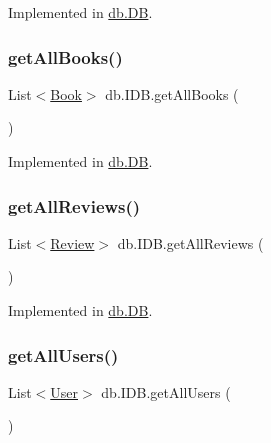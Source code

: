 Implemented in \hyperlink{classdb_1_1_d_b_a8a1a15bae4352c3c73092d801ef26c41}{db.\+DB}.

\mbox{\label{interfacedb_1_1_i_d_b_abd0d41674bbcdd524a3ca2403504bf25}} 
\subsubsection{\texorpdfstring{get\+All\+Books()}{getAllBooks()}}
{\footnotesize\ttfamily List$<$\hyperlink{classserver_1_1data_1_1_book}{Book}$>$ db.\+I\+D\+B.\+get\+All\+Books (\begin{DoxyParamCaption}{ }\end{DoxyParamCaption})}



Implemented in \hyperlink{classdb_1_1_d_b_ab4fbfd3716967ce37cc462ca04c68ca8}{db.\+DB}.

\mbox{\label{interfacedb_1_1_i_d_b_a08f60c8b923599c650f04b4192d00d55}} 
\subsubsection{\texorpdfstring{get\+All\+Reviews()}{getAllReviews()}}
{\footnotesize\ttfamily List$<$\hyperlink{classserver_1_1data_1_1_review}{Review}$>$ db.\+I\+D\+B.\+get\+All\+Reviews (\begin{DoxyParamCaption}{ }\end{DoxyParamCaption})}



Implemented in \hyperlink{classdb_1_1_d_b_ac7a84c5621f4ad2263cd830dbf10842e}{db.\+DB}.

\mbox{\label{interfacedb_1_1_i_d_b_a39ad15619eae3d0ec652e1849e3ebd50}} 
\subsubsection{\texorpdfstring{get\+All\+Users()}{getAllUsers()}}
{\footnotesize\ttfamily List$<$\hyperlink{classserver_1_1data_1_1_user}{User}$>$ db.\+I\+D\+B.\+get\+All\+Users (\begin{DoxyParamCaption}{ }\end{DoxyParamCaption})}



